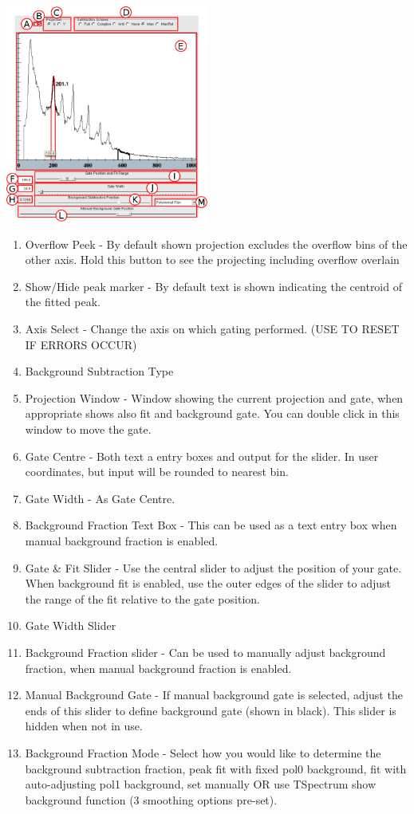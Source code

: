 \documentclass[a4paper,10pt]{article}
\begin{document}
\begin{center}
\includegraphics[width=0.5\textwidth]{toolB.png}
\end{center}
\begin{enumerate}
\item Overflow Peek - By default shown projection excludes the overflow bins of the other axis. Hold this button to see the projecting including overflow overlain  
\item Show/Hide peak marker - By default text is shown indicating the centroid of the fitted peak.
\item Axis Select - Change the axis on which gating performed. (USE TO RESET IF ERRORS OCCUR)
\item Background Subtraction Type
\item Projection Window - Window showing the current projection and gate, when appropriate shows also fit and background gate. You can double click in this window to move the gate.
\item Gate Centre - Both text a entry boxes and output for the slider. In user coordinates, but input will be rounded to nearest bin. 
\item Gate Width - As Gate Centre. 
\item Background Fraction Text Box - This can be used as a text entry box when manual background fraction is enabled.
\item Gate \& Fit Slider - Use the central slider to adjust the position of your gate. When background fit is enabled, use the outer edges of the slider to adjust the range of the fit relative to the gate position.
\item Gate Width Slider
\item Background Fraction slider - Can be used to manually adjust background fraction, when manual background fraction is enabled.
\item Manual Background Gate - If manual background gate is selected, adjust the ends of this slider to define background gate (shown in black). This slider is hidden when not in use.
\item Background Fraction Mode -
Select how you would like to determine the background subtraction fraction, peak fit with fixed pol0 background, fit with auto-adjusting pol1 background, set manually OR use TSpectrum show background function (3 smoothing options pre-set).


\end{enumerate}
\end{document}
